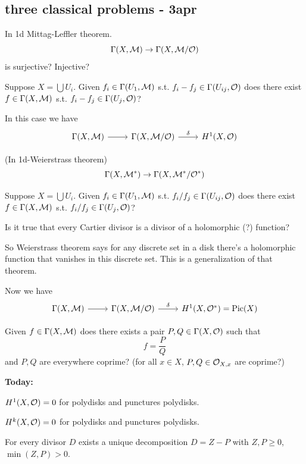 \subsection{three classical problems - 3apr}
\begin{question}
	In 1d Mittag-Leffler theorem.
	\[\Gamma(X,\mathcal{M})\to\Gamma(X,\mathcal{M}/\mathcal{O})\]
	is surjective? Injective?
	
	Suppose $X=\bigcup U_i$. Given $f_i\in\Gamma(U_1,\mathcal{M})$ s.t. $f_i-f_j\in\Gamma(U_{ij},\mathcal{O})$ does there exist $f\in\Gamma(X,\mathcal{M})$ s.t. $f_i-f_j\in\Gamma(U_{j},\mathcal{O})$?
	
	In this case we have
	\[\begin{tikzcd}
		\Gamma(X,\Mc)\arrow[r]&\Gamma(X,\Mc/\Oc)\arrow[r,"\delta"]&H^1(X,\Oc)
	\end{tikzcd}\]
\end{question}
\begin{question}
	(In 1d-Weierstrass theorem)
	\[\Gamma(X,\mathcal{M}^*)\to\Gamma(X,\mathcal{M}^*/\mathcal{O}^*)\]
	
	Suppose $X=\bigcup U_i$. Given $f_i\in\Gamma(U_1,\mathcal{M})$ s.t. $f_i/f_j\in\Gamma(U_{ij},\mathcal{O})$ does there exist $f\in\Gamma(X,\mathcal{M})$ s.t. $f_i/f_j\in\Gamma(U_{j},\mathcal{O})$?
	
	Is it true that every Cartier divisor is a divisor of a {\color{cyan}holomorphic (?)} function?
	
	So Weierstrass theorem says for any discrete set in a disk there's a holomorphic function that vanishes in this discrete set. This is a generalization of that theorem.
	
	Now we have
	\[\begin{tikzcd}
		\Gamma(X,\Mc)\arrow[r]&\Gamma(X,\Mc/\Oc)\arrow[r,"\delta"]&H^1(X,\Oc^*)=\Pic(X)
	\end{tikzcd}\]
\end{question}
\begin{question}
	Given $f\in\Gamma(X,\mathcal{M})$ does there exists a pair $P,Q\in\Gamma(X,\mathcal{O})$ such that
	\[f=\frac{P}{Q}\]
	and $P,Q$ are everywhere coprime? (for all $x\in X$, $P,Q\in\mathcal{O}_{X,x}$ are coprime?) 
\end{question}
\textbf{Today:}
\begin{claim}
	$H^1(X,\mathcal{O})=0$ for polydisks and punctures polydisks.
\end{claim}
\begin{coro}
	$H^k(X,\mathcal{O})=0$ for polydisks and punctures polydisks.
\end{coro}
\begin{lemma}
	For every divisor $D$ exists a unique decomposition $D=Z-P$ with $Z,P\geq0$, $\min(Z,P)>0$.
\end{lemma}
